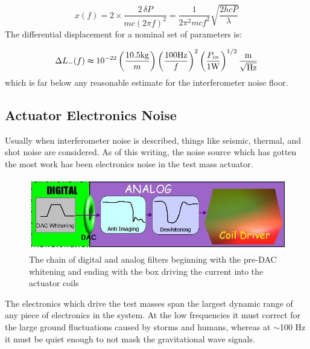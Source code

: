 \begin{equation}
x(f) = 2 \times \frac{2 \, \delta P}{m c (2 \pi f)^2}
                = \frac{1}{2 \pi^2 m c f^2} \sqrt{\frac{2 h c P}{\lambda}}
\end{equation}
The differential displacement for a nominal set of parameters is:

\begin{equation}
\Delta L_{-}(f) \thickapprox 10^{-22} \left(\frac{10.5 \mbox{kg}}{m}\right) 
                                      \left(\frac{100 \mbox{Hz}}{f}\right)^2
                           \left(\frac{P_{in}}{1 \mbox{W}}\right)^{1/2}
                            \frac{\mbox{m}}{\sqrt{\mbox{Hz}}}
\end{equation}
which is far below any reasonable estimate for the interferometer noise floor.


\subsection{Actuator Electronics Noise}

Usually when interferometer noise is described, things like
seismic, thermal, and shot noise are considered. As of this writing, the
noise source which has gotten the most work has been electronics noise in
the test mass actuator.

\begin{figure}[!h]
\centerline{
\includegraphics[angle=0,width=6.5in]{Figures/Chap4/actuation.jpg}}
\caption[Actuation Electronics]{The chain of digital and analog filters
         beginning with the pre-DAC whitening and ending with the box
         driving the current into the actuator coils}
\label{fig:OutputElectronics}
\end{figure}

The electronics which drive the test masses span the largest dynamic
range of any piece of electronics in the system. At the low frequencies it must correct
for the large ground fluctuations caused by storms and humans, whereas at
$\sim$100 Hz it must be quiet enough to not mask the gravitational wave
signals.

